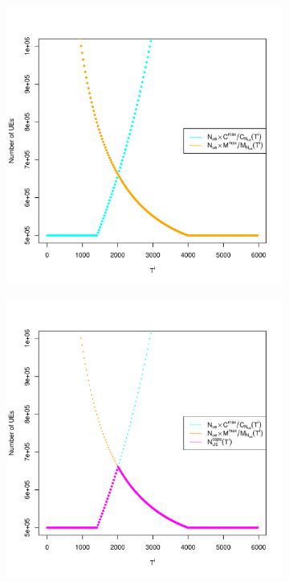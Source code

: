 \documentclass[a4j]{ujarticle}
\begin{document}
\begin{figure}[htbp]
 \centering
 \begin{subfigure}{0.49\hsize}
   \centering
   \includegraphics[width=1\hsize]{theory_1_add_C_M.pdf}
   \label{theory_1_add_C_M}
 \end{subfigure}
 \begin{subfigure}{0.49\hsize}
   \centering
   \includegraphics[width=1\hsize]{theory_1_add_all.pdf}
   \label{theory_1_add_all}
 \end{subfigure}
 \caption{}
 \label{}
\end{figure}
\end{document}
